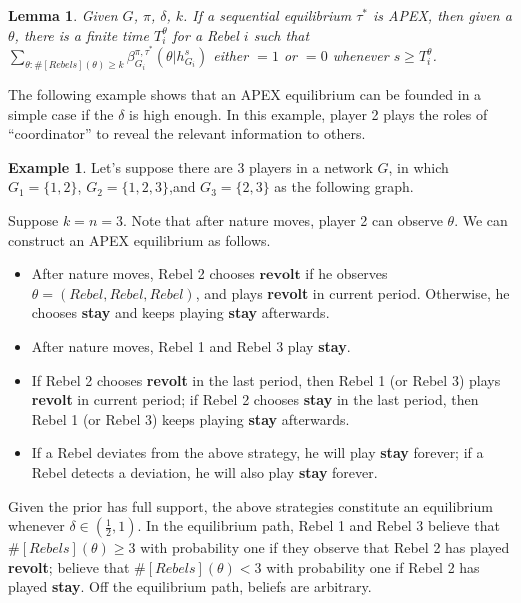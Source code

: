 \documentclass[12pt,letterpaper]{article}
\newtheorem{lemma}{Lemma}[section]
\theoremstyle{definition}
\newtheorem{example}{Example}[section]
\theoremstyle{remark}
\theoremstyle{claim}
\begin{document}
\begin{lemma}\label{lemma_learn}
Given $G$, $\pi$, $\delta$, $k$. If a sequential equilibrium $\tau^*$ is APEX, then given a $\theta$, there is a finite time $T^{\theta}_i$ for a Rebel $i$ such that $\sum_{\theta:\#[Rebels](\theta)\geq k}\beta^{\pi,\tau^*}_{G_i}(\theta|h^{s}_{G_i})$ either $=1$ or $=0$
whenever $s\geq T^{\theta}_i$.
\end{lemma}


The following example shows that an APEX equilibrium can be founded in a simple case if the $\delta$ is high enough. In this example, player 2 plays the roles of ``coordinator'' to reveal the relevant information to others.
\begin{example}\label{ex_leading_ex}
Let's suppose there are 3 players in a network $G$, in which $G_1=\{1,2\}$, $G_2=\{1,2,3\}$,and $G_3=\{2,3\}$ as the following graph.

\begin{center}
\end{center}

Suppose $k=n=3$. Note that after nature moves, player 2 can observe $\theta$.  We can construct an APEX equilibrium as follows.

\begin{itemize}
\item After nature moves, Rebel 2 chooses $\textbf{revolt}$ if he observes $\theta=(Rebel,Rebel,Rebel)$, and plays \textbf{revolt} in current period. Otherwise, he chooses \textbf{stay} and keeps playing \textbf{stay} afterwards. 
\item After nature moves, Rebel 1 and Rebel 3 play \textbf{stay}.
\item If Rebel 2 chooses \textbf{revolt} in the last period, then Rebel 1 (or Rebel 3) plays \textbf{revolt} in current period; if Rebel 2 chooses \textbf{stay} in the last period, then Rebel 1 (or Rebel 3) keeps playing \textbf{stay} afterwards. 
\item If a Rebel deviates from the above strategy, he will play \textbf{stay} forever; if a Rebel detects a deviation, he will also play \textbf{stay} forever.
\end{itemize}

Given the prior has full support, the above strategies constitute an equilibrium  whenever $\delta\in (\frac{1}{2},1)$. In the equilibrium path, Rebel 1 and Rebel 3 believe that $\#[Rebels](\theta)\geq 3$ with probability one if they observe that Rebel 2 has played \textbf{revolt}; believe that $\#[Rebels](\theta)< 3$ with probability one if Rebel 2 has played \textbf{stay}. Off the equilibrium path, beliefs are arbitrary.
\end{example}
\end{document}
